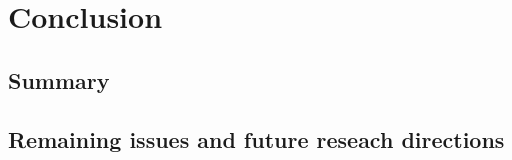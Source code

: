 \chapter{Conclusion}
\lipsum[1]
\section{Summary}
\lipsum[1]
\section{Remaining issues and future reseach directions}
\lipsum[1]